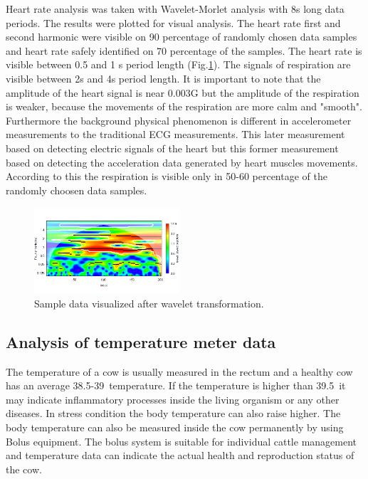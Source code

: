 \documentclass[conference]{IEEEtran}
\begin{document}
Heart rate analysis was taken with Wavelet-Morlet analysis \cite{khoor2007} with 8s long data
periods. The results were plotted for visual analysis. The heart rate first and
second harmonic were visible on 90 percentage of randomly chosen data samples
and heart rate safely identified on 70 percentage of the samples. The heart
rate is visible between 0.5 and 1 s period length (Fig.\ref{heart-wavelet}).
The signals of respiration are visible between 2s and 4s period length. It is
important to note that the amplitude of the heart signal is near 0.003G but the
amplitude of the respiration is weaker, because the movements of the
respiration are more calm and "smooth". Furthermore the background physical
phenomenon is different in accelerometer measurements to the traditional ECG
measurements. This later measurement based on detecting electric signals of the
heart but this former measurement based on detecting the acceleration data
generated by heart muscles movements.   According to this the respiration is
visible only in 50-60 percentage of the randomly choosen data samples.

\begin{figure}[htbp]
\centerline{\includegraphics[width=0.48\textwidth]{fig/Wavelet.png}}
  \caption{Sample data visualized after wavelet transformation.}
\label{heart-wavelet}
\end{figure}

\subsection{Analysis of temperature meter data}

The temperature of a cow is usually measured in the rectum and a healthy cow
has an average 38.5-39\textcelsius\  temperature. If the temperature is
higher than 39.5\textcelsius\  it may indicate inflammatory processes inside
the living organism or any other diseases. In stress condition the body
temperature can also raise higher. The body temperature can also be measured
inside the cow permanently by using Bolus equipment. The bolus system is
suitable for individual cattle management and temperature data can indicate the
actual health and reproduction status of the cow.
\end{document}
